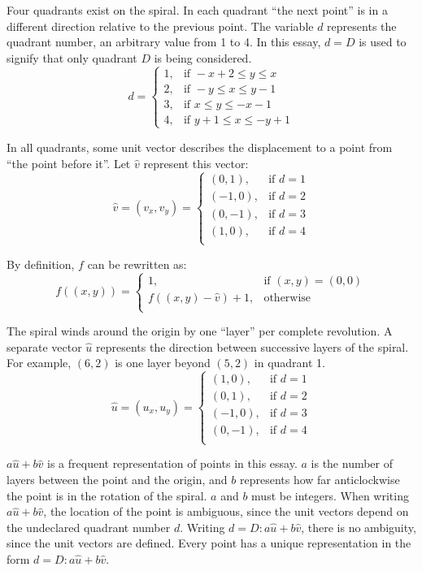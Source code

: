 \documentclass{article}
\begin{document}
Four quadrants exist on the spiral. In each quadrant ``the next point'' is in a different direction relative to the previous point. The variable \(d\) represents the quadrant number, an arbitrary value from 1 to 4. In this essay, \(d=D\) is used to signify that only quadrant \(D\) is being considered.
	\[d = \begin{cases}
		  1,	&\text{if } -x+2 \leq y \leq x\\
		  2,	&\text{if } -y \leq x \leq y-1\\
		  3,	&\text{if } x \leq y \leq -x-1\\
		  4,	&\text{if } y+1 \leq x \leq -y+1
		  \end{cases}\]

In all quadrants, some unit vector describes the displacement to a point from ``the point before it''. Let \(\hat{v}\) represent this vector:
	\[\hat{v} = (v_x,v_y) = \begin{cases} 
							(0,1),	&\text{if }d=1\\
							(-1,0),	&\text{if }d=2\\
							(0,-1),	&\text{if }d=3\\
							(1,0),	&\text{if }d=4\\
							\end{cases}\]
							
By definition, \(f\) can be rewritten as:
	\[f((x,y)) = \begin{cases}
				 1,						&\text{if } (x,y) = (0,0) \\
				 f((x,y)-\hat{v}) + 1, 	& \text{otherwise} \\
				 \end{cases}\]

The spiral winds around the origin by one ``layer'' per complete revolution. A separate vector \(\hat{u}\) represents the direction between successive layers of the spiral. For example, \((6,2)\) is one layer beyond \((5,2)\) in quadrant 1.
	\[\hat{u} = (u_x,u_y) = \begin{cases}
							(1,0),	&\text{if }d=1\\
							(0,1),	&\text{if }d=2\\
							(-1,0),	&\text{if }d=3\\
							(0,-1),	&\text{if }d=4\\
							\end{cases}\]

\(a\hat{u}+b\hat{v}\) is a frequent representation of points in this essay. \(a\) is the number of layers between the point and the origin, and \(b\) represents how far anticlockwise the point is in the rotation of the spiral. \(a\) and \(b\) must be integers. When writing \(a\hat{u}+b\hat{v}\), the location of the point is ambiguous, since the unit vectors depend on the undeclared quadrant number \(d\). Writing \(d=D:a\hat{u}+b\hat{v}\), there is no ambiguity, since the unit vectors are defined. Every point has a unique representation in the form \(d=D:a\hat{u}+b\hat{v}\).
				 
\end{document}
